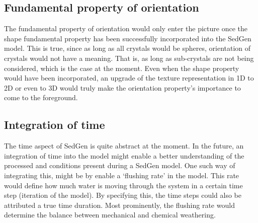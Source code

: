     \subsection{Fundamental property of orientation}
    The fundamental property of orientation would only enter the picture once the shape fundamental property has been successfully incorporated into the SedGen model. %
    This is true, since as long as all crystals would be spheres, orientation of crystals would not have a meaning. %
    That is, as long as sub-crystals are not being considered, which is the case at the moment. %
    Even when the shape property would have been incorporated, an upgrade of the texture representation in 1D to 2D or even to 3D would truly make the orientation property's importance to come to the foreground. %

    \subsection{Integration of time}
    The time aspect of SedGen is quite abstract at the moment. %
    In the future, an integration of time into the model might enable a better understanding of the processed and conditions present during a SedGen model. %
    One such way of integrating this, might be by enable a `flushing rate' in the model. %
    This rate would define how much water is moving through the system in a certain time step (iteration of the model). %
    By specifying this, the time steps could also be attributed a true time duration. %
    Most prominently, the flushing rate would determine the balance between mechanical and chemical weathering. %


\cleardoublepage

